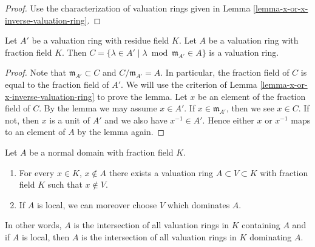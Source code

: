 \begin{proof}
Use the characterization of valuation rings given
in Lemma \ref{lemma-x-or-x-inverse-valuation-ring}.
\end{proof}

\begin{lemma}
\label{lemma-stack-valuation-rings}
Let $A'$ be a valuation ring with residue field $K$.
Let $A$ be a valuation ring with fraction field $K$.
Then
$C = \{\lambda \in A' \mid \lambda \bmod \mathfrak m_{A'} \in A\}$
is a valuation ring.
\end{lemma}

\begin{proof}
Note that $\mathfrak m_{A'} \subset C$ and $C/\mathfrak m_{A'} = A$.
In particular, the fraction field of $C$ is equal to the fraction field
of $A'$. We will use the criterion of
Lemma \ref{lemma-x-or-x-inverse-valuation-ring} to prove the lemma.
Let $x$ be an element of the fraction field of $C$.
By the lemma we may assume $x \in A'$. If $x \in \mathfrak m_{A'}$,
then we see $x \in C$. If not, then $x$ is a unit of $A'$ and we
also have $x^{-1} \in A'$. Hence either $x$ or $x^{-1}$ maps to
an element of $A$ by the lemma again.
\end{proof}

\begin{lemma}
\label{lemma-find-valuation-rings}
Let $A$ be a normal domain with fraction field $K$.
\begin{enumerate}
\item For every $x \in K$, $x \not \in A$ there exists a valuation ring
$A \subset V \subset K$ with fraction field $K$ such that $x \not \in V$.
\item If $A$ is local, we can moreover choose $V$ which dominates $A$.
\end{enumerate}
In other words, $A$ is the intersection of all valuation rings in $K$
containing $A$ and if $A$ is local, then $A$ is the intersection of
all valuation rings in $K$ dominating $A$.
\end{lemma}

